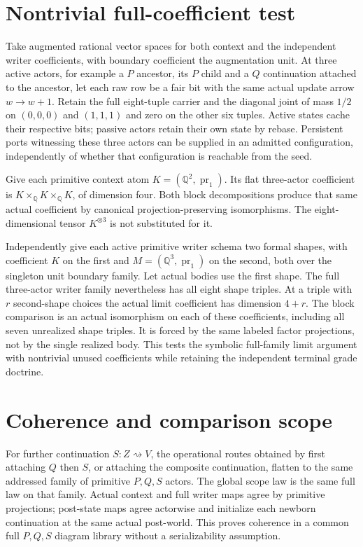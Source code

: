 \documentclass[11pt]{article}
\begin{document}
\section{Nontrivial full-coefficient test}
Take augmented rational vector spaces for both context and the independent writer coefficients, with boundary coefficient the augmentation unit. At three active actors, for example a $P$ ancestor, its $P$ child and a $Q$ continuation attached to the ancestor, let each raw row be a fair bit with the same actual update arrow $w\to w+1$. Retain the full eight-tuple carrier and the diagonal joint of mass $1/2$ on $(0,0,0)$ and $(1,1,1)$ and zero on the other six tuples. Active states cache their respective bits; passive actors retain their own state by rebase. Persistent ports witnessing these three actors can be supplied in an admitted configuration, independently of whether that configuration is reachable from the seed.

Give each primitive context atom $K=(\mathbb Q^2,\operatorname{pr}_1)$. Its flat three-actor coefficient is $K\times_{\mathbb Q}K\times_{\mathbb Q}K$, of dimension four. Both block decompositions produce that same actual coefficient by canonical projection-preserving isomorphisms. The eight-dimensional tensor $K^{\otimes3}$ is not substituted for it.

Independently give each active primitive writer schema two formal shapes, with coefficient $K$ on the first and $M=(\mathbb Q^3,\operatorname{pr}_1)$ on the second, both over the singleton unit boundary family. Let actual bodies use the first shape. The full three-actor writer family nevertheless has all eight shape triples. At a triple with $r$ second-shape choices the actual limit coefficient has dimension $4+r$. The block comparison is an actual isomorphism on each of these coefficients, including all seven unrealized shape triples. It is forced by the same labeled factor projections, not by the single realized body. This tests the symbolic full-family limit argument with nontrivial unused coefficients while retaining the independent terminal grade doctrine.

\section{Coherence and comparison scope}
For further continuation $S:Z\rightsquigarrow V$, the operational routes obtained by first attaching $Q$ then $S$, or attaching the composite continuation, flatten to the same addressed family of primitive $P,Q,S$ actors. The global scope law is the same full law on that family. Actual context and full writer maps agree by primitive projections; post-state maps agree actorwise and initialize each newborn continuation at the same actual post-world. This proves coherence in a common full $P,Q,S$ diagram library without a serializability assumption.
\end{document}
